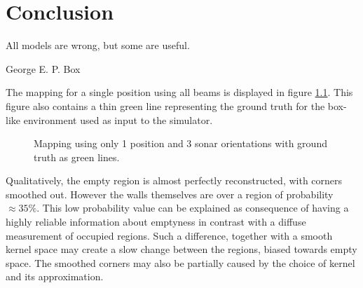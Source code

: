 \chapter{Conclusion}
\setlength{\epigraphwidth}{.45\textwidth}
\epigraph{All models are wrong, but some are useful.}{George E. P. Box}

The mapping for a single position using all beams is displayed in figure
\ref{fig:truth_map}. This figure also contains a thin green line representing
the ground truth for the box-like environment used as input to the simulator.

\begin{figure}[ht]
    \centering
    \hfill {}%
    \caption{Mapping using only 1 position and 3 sonar orientations with
    ground truth as green lines.}%
    \label{fig:truth_map}%
\end{figure}

Qualitatively, the empty region is almost perfectly reconstructed, with corners
smoothed out. However the walls themselves are over a region of probability
$\approx35\%$. This low probability value can be explained as consequence of
having a highly reliable information about emptyness in contrast with a
diffuse measurement of occupied regions. Such a difference, together with a smooth kernel
space may create a slow change between the regions, biased towards empty space.
The smoothed corners may also be partially caused by the choice of
kernel and its approximation.

